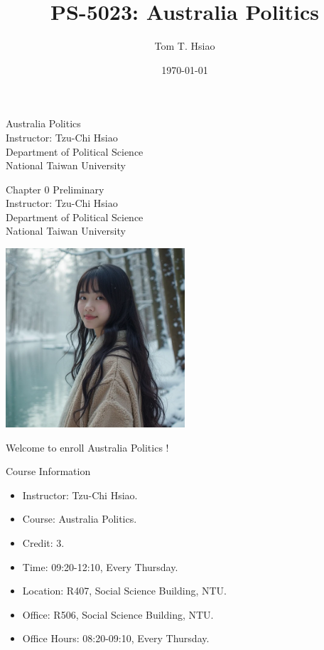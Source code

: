 \documentclass{beamer}
\title{PS-5023: Australia Politics}
\author{Tom T. Hsiao}
\date{\today}
\begin{document}
\begin{frame}
\begin{center}
\Large{Australia Politics} \\
\vspace{3em}
\normalsize{Instructor: Tzu-Chi Hsiao} \\
\vspace{3em}
\small{Department of Political Science} \\
\vspace{1em}
\small{National Taiwan University}
\end{center}
\end{frame}
\begin{frame}
\begin{center}
\Large{Chapter 0 Preliminary} \\
\vspace{3em}
\normalsize{Instructor: Tzu-Chi Hsiao} \\
\vspace{3em}
\small{Department of Political Science} \\
\vspace{1em}
\small{National Taiwan University} \\
\end{center}
\end{frame}
\begin{frame}{}
\begin{center}
\includegraphics[width=0.5\textwidth]{instructor.png}
\end{center}
\vspace{1em}
\begin{center}
\Large{Welcome to enroll Australia Politics !}
\end{center}
\end{frame}
\begin{frame}{Course Information}
\begin{itemize}
\item Instructor: Tzu-Chi Hsiao.
\item Course: Australia Politics.
\item Credit: 3.
\item Time: 09:20-12:10, Every Thursday.
\item Location: R407, Social Science Building, NTU. 
\item Office: R506, Social Science Building, NTU.
\item Office Hours: 08:20-09:10, Every Thursday.
\end{itemize}
\end{frame}
\end{document}
